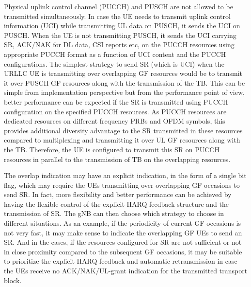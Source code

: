 \documentclass[conference]{IEEEtran}
\begin{document}
Physical uplink control channel (PUCCH) and PUSCH are not allowed to be transmitted simultaneously. In case the UE needs to transmit uplink control information (UCI) while transmitting UL data on PUSCH, it sends the UCI on PUSCH. When the UE is not transmitting PUSCH, it sends the UCI carrying SR, ACK/NAK for DL data, CSI reports etc, on the PUCCH resources using appropriate PUCCH format as a function of UCI content and the PUCCH configurations. The simplest strategy to send SR (which is UCI) when the URLLC UE is transmitting over overlapping GF resources would be to transmit it over PUSCH GF resources along with the transmission of the TB. This can be simple from implementation perspective but from the performance point of view, better performance can be expected if the SR is transmitted using PUCCH configuration on the specified PUCCH resources. As PUCCH resources are dedicated resources on different frequency PRBs and OFDM symbols, this provides additional diversity advantage to the SR transmitted in these resources compared to multiplexing and transmitting it over UL GF resources along with the TB. Therefore, the UE is configured to transmit this SR on PUCCH resources in parallel to the transmission of TB on the overlapping resources.

The overlap indication may have an explicit indication, in the form of a single bit flag, which may require the UEs transmitting over overlapping GF occasions to send SR. In fact, more flexibility and better performance can be achieved by having the flexible control of the explicit HARQ feedback structure and the transmission of SR. The gNB can then choose which strategy to choose in different situations. As an example, if the periodicity of current GF occasions is not very fast, it may make sense to indicate the overlapping GF UEs to send an SR. And in the cases, if the resources configured for SR are not sufficient or not in close proximity compared to the subsequent GF occasions, it may be suitable to prioritize the explicit HARQ feedback and automatic retransmission in case the UEs receive no ACK/NAK/UL-grant indication for the transmitted transport block.

\end{document}
